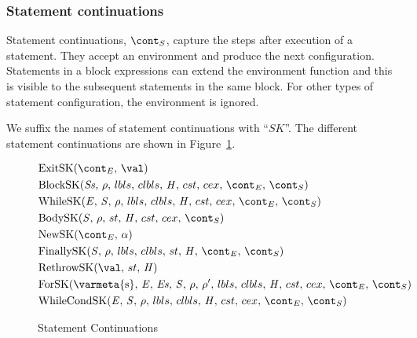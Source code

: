 \documentclass[a4paper,oneside]{article}
\begin{document}
\subsubsection{Statement continuations}
\label{subsubsec:statement-continuations}

Statement continuations, $\scont$, capture the steps after execution of a statement.
They accept an environment and produce the next configuration.
Statements in a block expressions can extend the environment function and this is visible to the subsequent statements in the same block.
For other types of statement configuration, the environment is ignored.

We suffix the names of statement continuations with ``$SK$''.
The different statement continuations are shown in Figure~\ref{figure:sconts}.
\newcommand{\ExitSK}[1]{\mathrm{ExitSK}(\econt,\,#1)}
\newcommand{\BlockSK}[2]{\mathrm{BlockSK}({#1},\,{#2},\,\lbls,\,\clbls,\,\handler,\,\cstrace,\,\cex,\,\econt,\,\scont)}
\newcommand{\WhileSK}{\mathrm{WhileSK}(\expr,\,\stmt,\,\env,\,\lbls,\,\clbls,\,\handler,\,\cstrace,\,\cex,\,\econt,\,\scont)}
\newcommand{\BodySK}[3]{\mathrm{BodySK}({#1},\,{#2},\,\strace,\,\handler,\,\cstrace,\,\cex,\,{#3})}
\newcommand{\NewSK}[2]{\mathrm{NewSK}({#1},\,{#2})}
\newcommand{\FinallySK}[1]{\mathrm{FinallySK}({#1},\,\env,\,\lbls,\,\clbls,\,\strace,\,\handler,\,\econt,\,\scont)}
\newcommand{\RethrowSK}[3]{\mathrm{RethrowSK}({#1},\,{#2},\,{#3})}
%
\newcommand{\ForSK}{\mathrm{ForSK}(\mathrm{\varmeta{s}},\, \expressionmeta,\, \exprs,\, \statementmeta,\, \env,\, \env',\, \lbls,\, \clbls,\, \handler,\, \cstrace,\, \cex,\, \econt,\, \scont)}
%
\newcommand{\WhileCondSK}{\mathrm{WhileCondSK}(\expr,\,\stmt,\,\env,\,\lbls,\,\clbls,\,\handler,\,\cstrace,\,\cex,\,\econt,\,\scont)}
\begin{figure}[Htp]
  \begin{align}
    &\ExitSK{\val} \label{scont:exit}\\
    &\BlockSK{\stmts}{\env} \label{scont:block}\\
    &\WhileSK \label{scont:while}\\
    &\BodySK{\stmt}{\env}{\scont} \label{scont:body}\\
    &\NewSK{\econt}{\loc} \label{scont:new}\\
    &\FinallySK{\stmt} \label{scont:finally}\\
    &\RethrowSK{\val}{\strace}{\handler} \label{scont:rethrow}\\
    &\ForSK \label{scont:for}\\
    &\WhileCondSK \label{scont:while}
  \end{align}
  \caption{Statement Continuations}
  \label{figure:sconts}
\end{figure}
\end{document}
